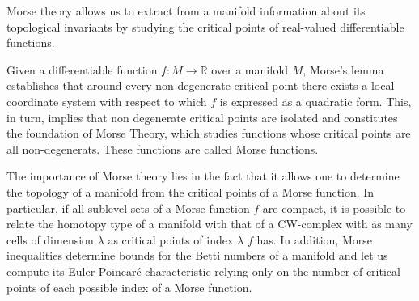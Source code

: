 
Morse theory allows us to extract from a manifold information about its topological invariants by studying the critical points of real-valued differentiable functions.

Given a differentiable function $f:M\to \mathbb{R}$ over a manifold $M$, Morse's lemma establishes that around every non-degenerate critical point there exists a local coordinate system with respect to which $f$ is expressed as a quadratic form. This, in turn, implies that non degenerate critical points are isolated and constitutes the foundation of Morse Theory, which studies functions whose critical points are all non-degenerats. These functions are called Morse functions.

The importance of Morse theory lies in the fact that it allows one to determine the topology of a manifold from the critical points of a Morse function. In particular, if all sublevel sets of a Morse function $f$ are compact, it is possible to relate the homotopy type of a manifold with that of a CW-complex with as many cells of dimension $\lambda$ as critical points of index $\lambda$ $f$ has. In addition, Morse inequalities determine bounds for the Betti numbers of a manifold and let us compute its Euler-Poincaré characteristic relying only on the number of critical points of each possible index of a Morse function.


